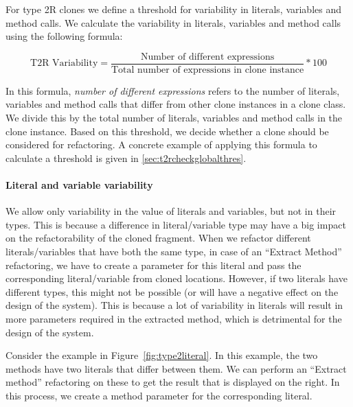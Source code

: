 For type 2R clones we define a threshold for variability in literals, variables and method calls. We calculate the variability in literals, variables and method calls using the following formula:

\begin{equation}\label{eq:type2r}
\text{T2R Variability}=\frac{\text{Number of different expressions}}{\text{Total number of expressions in clone instance}}*100
\end{equation}

In this formula, \textit{number of different expressions} refers to the number of literals, variables and method calls that differ from other clone instances in a clone class. We divide this by the total number of literals, variables and method calls in the clone instance. Based on this threshold, we decide whether a clone should be considered for refactoring. A concrete example of applying this formula to calculate a threshold is given in \ref{sec:t2rcheckglobalthres}.

\paragraph{Literal and variable variability}\label{sec:t2rliteralandvariable}
We allow only variability in the value of literals and variables, but not in their types. This is because a difference in literal/variable type may have a big impact on the refactorability of the cloned fragment. When we refactor different literals/variables that have both the same type, in case of an ``Extract Method'' refactoring, we have to create a parameter for this literal and pass the corresponding literal/variable from cloned locations. However, if two literals have different types, this might not be possible (or will have a negative effect on the design of the system). This is because a lot of variability in literals will result in more parameters required in the extracted method, which is detrimental for the design of the system.

Consider the example in Figure~\ref{fig:type2literal}. In this example, the two methods have two literals that differ between them. We can perform an ``Extract method'' refactoring on these to get the result that is displayed on the right. In this process, we create a method parameter for the corresponding literal.

